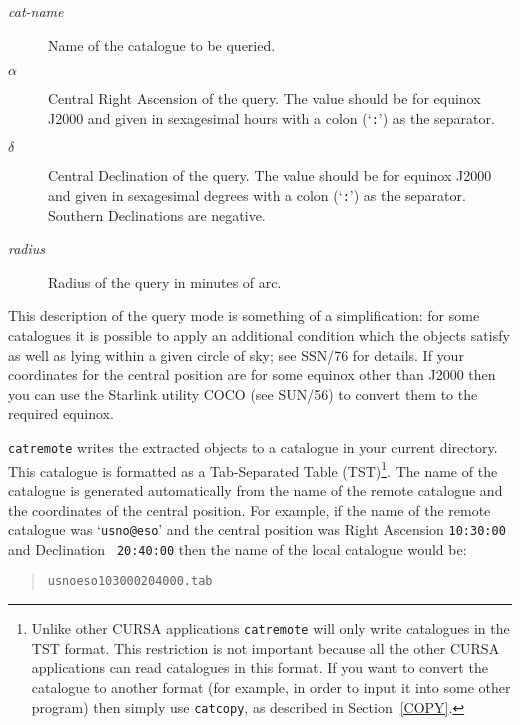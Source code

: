 \documentclass[twoside,11pt]{article}
\newcommand{\xref}[3]{#1}
\renewcommand{\_}{\texttt{\symbol{95}}}
\begin{document}
\begin{description}

  \item[{\it cat-name}\/] Name of the catalogue to be queried.

  \item[$\alpha$\/] Central Right Ascension of the query.  The value
   should be for equinox J2000 and given in sexagesimal hours with a colon
   (`{\tt :}') as the separator.

  \item[$\delta$\/] Central Declination of the query.  The value should be
   for equinox J2000 and given in sexagesimal degrees with a colon (`{\tt :}')
   as the separator.  Southern Declinations are negative.

  \item[{\it radius}\/] Radius of the query in minutes of arc.

\end{description}

This description of the query mode is something of a simplification: for
some catalogues it is possible to apply an additional condition which
the objects satisfy as well as lying within a given circle of sky; see
\xref{SSN/76}{ssn76}{}\cite{SSN76} for details.  If your coordinates for
the central position are for some equinox other than J2000 then you can use
the Starlink utility COCO (see SUN/56\cite{SUN56}) to convert them to the
required equinox.

{\tt catremote} writes the extracted objects to a catalogue in your
current directory.  This catalogue is formatted as a Tab-Separated Table
(TST)\footnote{Unlike other CURSA applications {\tt catremote} will only
write catalogues in the TST format.  This restriction is not important
because all the other CURSA applications can read catalogues in this
format.  If you want to convert the catalogue to another format (for
example, in order to input it into some other program) then simply use
{\tt catcopy}, as described in Section~\ref{COPY}.}.  The name of the
catalogue is generated automatically from the name of the remote
catalogue and the coordinates of the central position.  For example,
if the name of the remote catalogue was `{\tt usno@eso}' and the central
position was Right Ascension {\tt 10:30:00} and Declination {\tt
20:40:00} then the name of the local catalogue would be:

\begin{verse}
{\tt usno\_eso\_103000\_204000.tab}
\end{verse}
\end{document}
